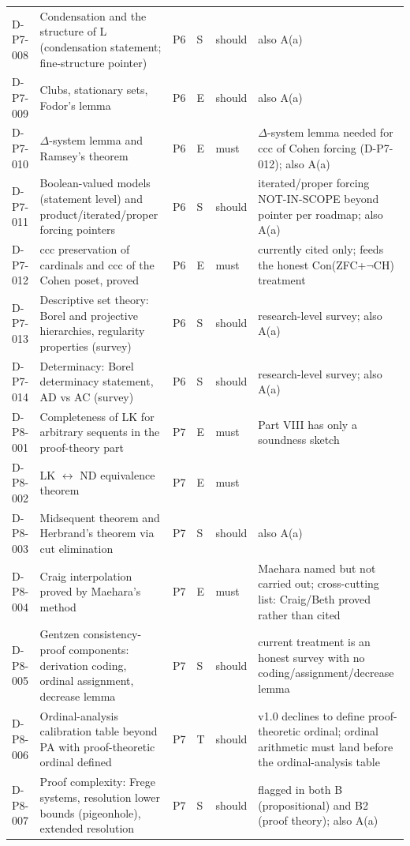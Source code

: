 \begin{longtable}{@{}p{0.62in}p{2.6in}p{0.75in}p{0.22in}p{0.42in}p{1.85in}@{}}
D-P7-008 & Condensation and the structure of L (condensation statement; fine-structure pointer) & P6 & S & should & also A(a) \\
D-P7-009 & Clubs, stationary sets, Fodor's lemma & P6 & E & should & also A(a) \\
D-P7-010 & \(\Delta\)-system lemma and Ramsey's theorem & P6 & E & must & \(\Delta\)-system lemma needed for ccc of Cohen forcing (D-P7-012); also A(a) \\
D-P7-011 & Boolean-valued models (statement level) and product/iterated/proper forcing pointers & P6 & S & should & iterated/proper forcing NOT-IN-SCOPE beyond pointer per roadmap; also A(a) \\
D-P7-012 & ccc preservation of cardinals and ccc of the Cohen poset, proved & P6 & E & must & currently cited only; feeds the honest Con(ZFC+\(\neg\)CH) treatment \\
D-P7-013 & Descriptive set theory: Borel and projective hierarchies, regularity properties (survey) & P6 & S & should & research-level survey; also A(a) \\
D-P7-014 & Determinacy: Borel determinacy statement, AD vs AC (survey) & P6 & S & should & research-level survey; also A(a) \\
D-P8-001 & Completeness of LK for arbitrary sequents in the proof-theory part & P7 & E & must & Part VIII has only a soundness sketch \\
D-P8-002 & LK \(\leftrightarrow\) ND equivalence theorem & P7 & E & must &  \\
D-P8-003 & Midsequent theorem and Herbrand's theorem via cut elimination & P7 & S & should & also A(a) \\
D-P8-004 & Craig interpolation proved by Maehara's method & P7 & E & must & Maehara named but not carried out; cross-cutting list: Craig/Beth proved rather than cited \\
D-P8-005 & Gentzen consistency-proof components: derivation coding, ordinal assignment, decrease lemma & P7 & S & should & current treatment is an honest survey with no coding/assignment/decrease lemma \\
D-P8-006 & Ordinal-analysis calibration table beyond PA with proof-theoretic ordinal defined & P7 & T & should & v1.0 declines to define proof-theoretic ordinal; ordinal arithmetic must land before the ordinal-analysis table \\
D-P8-007 & Proof complexity: Frege systems, resolution lower bounds (pigeonhole), extended resolution & P7 & S & should & flagged in both B (propositional) and B2 (proof theory); also A(a) \\

\end{longtable}
